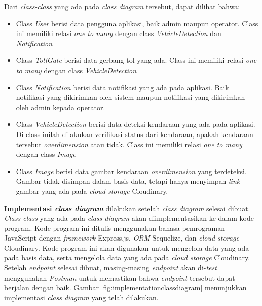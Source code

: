Dari \emph{class-class} yang ada pada \emph{class diagram} tersebut, dapat dilihat bahwa:
\begin{itemize}[nolistsep]
  \item Class \emph{User} berisi data pengguna aplikasi, baik admin maupun operator. Class ini memiliki relasi \emph{one to many} dengan class \emph{VehicleDetection} dan \emph{Notification}
  \item Class \emph{TollGate} berisi data gerbang tol yang ada. Class ini memiliki relasi \emph{one to many} dengan class \emph{VehicleDetection}
  \item Class \emph{Notification} berisi data notifikasi yang ada pada aplikasi. Baik notifikasi yang dikirimkan oleh sistem maupun notifikasi yang dikirimkan oleh admin kepada operator.
  \item Class \emph{VehicleDetection} berisi data deteksi kendaraan yang ada pada aplikasi. Di class inilah dilakukan verifikasi status dari kendaraan, apakah kendaraan tersebut \emph{overdimension} atau tidak. Class ini memiliki relasi \emph{one to many} dengan class \emph{Image}
  \item Class \emph{Image} berisi data gambar kendaraan \emph{overdimension} yang terdeteksi. Gambar tidak disimpan dalam basis data, tetapi hanya menyimpan \emph{link} gambar yang ada pada \emph{cloud storage} Cloudinary.
\end{itemize}

\textbf{Implementasi \emph{class diagram}} dilakukan setelah \emph{class diagram} selesai dibuat. \emph{Class-class} yang ada pada \emph{class diagram} akan diimplementasikan ke dalam kode program. Kode program ini ditulis menggunakan bahasa pemrograman JavaScript dengan \emph{framework} Express.js, \emph{ORM} Sequelize, dan \emph{cloud storage} Cloudinary. Kode program ini akan digunakan untuk mengelola data yang ada pada basis data, serta mengelola data yang ada pada \emph{cloud storage} Cloudinary. Setelah \emph{endpoint} selesai dibuat, masing-masing \emph{endpoint} akan di-\emph{test} menggunakan \emph{Postman} untuk memastikan bahwa \emph{endpoint} tersebut dapat berjalan dengan baik. Gambar \ref{fig:implementationclassdiagram} menunjukkan implementasi \emph{class diagram} yang telah dilakukan.

